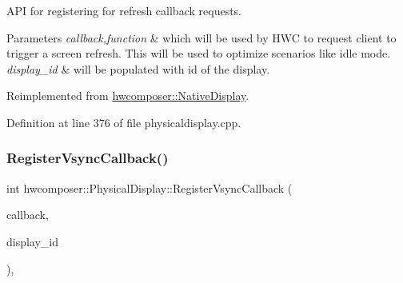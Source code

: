 A\+PI for registering for refresh callback requests. 
\begin{DoxyParams}{Parameters}
{\em callback,function} & which will be used by H\+WC to request client to trigger a screen refresh. This will be used to optimize scenarios like idle mode. \\
\hline
{\em display\+\_\+id} & will be populated with id of the display. \\
\hline
\end{DoxyParams}


Reimplemented from \mbox{\hyperlink{classhwcomposer_1_1NativeDisplay_a237627e6cacf9246813bc7f48c5817cd}{hwcomposer\+::\+Native\+Display}}.



Definition at line 376 of file physicaldisplay.\+cpp.


\begin{DoxyCode}{0}
\end{DoxyCode}
\mbox{\label{classhwcomposer_1_1PhysicalDisplay_ac003447bfca005292fc052d5b573869e}} 
\subsubsection{\texorpdfstring{Register\+Vsync\+Callback()}{RegisterVsyncCallback()}}
{\footnotesize\ttfamily int hwcomposer\+::\+Physical\+Display\+::\+Register\+Vsync\+Callback (\begin{DoxyParamCaption}\item[{std\+::shared\+\_\+ptr$<$ \mbox{\hyperlink{classhwcomposer_1_1VsyncCallback}{Vsync\+Callback}} $>$}]{callback,  }\item[{uint32\+\_\+t}]{display\+\_\+id }\end{DoxyParamCaption})\hspace{0.3cm}{\ttfamily [override]}, {\ttfamily [virtual]}}



